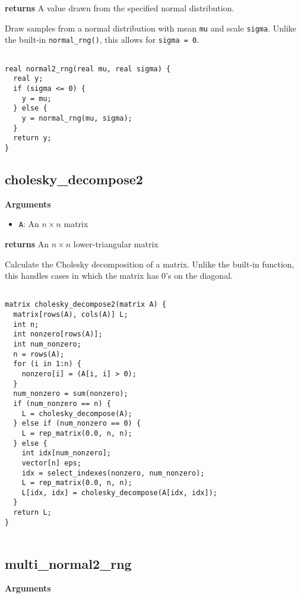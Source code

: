 \documentclass[]{book}
\providecommand{\tightlist}{%
  \setlength{\itemsep}{0pt}\setlength{\parskip}{0pt}}
\begin{document}
\textbf{returns} A value drawn from the specified normal distribution.

Draw samples from a normal distribution with mean \texttt{mu} and scale
\texttt{sigma}. Unlike the built-in \texttt{normal\_rng()}, this allows
for \texttt{sigma\ =\ 0}.

\begin{verbatim}

real normal2_rng(real mu, real sigma) {
  real y;
  if (sigma <= 0) {
    y = mu;
  } else {
    y = normal_rng(mu, sigma);
  }
  return y;
}

\end{verbatim}

\subsection{cholesky\_decompose2}\label{cholesky_decompose2}

\textbf{Arguments}

\begin{itemize}
\tightlist
\item
  \texttt{A}: An \(n \times n\) matrix
\end{itemize}

\textbf{returns} An \(n \times n\) lower-triangular matrix

Calculate the Cholesky decomposition of a matrix. Unlike the built-in
function, this handles cases in which the matrix has 0's on the
diagonal.

\begin{verbatim}

matrix cholesky_decompose2(matrix A) {
  matrix[rows(A), cols(A)] L;
  int n;
  int nonzero[rows(A)];
  int num_nonzero;
  n = rows(A);
  for (i in 1:n) {
    nonzero[i] = (A[i, i] > 0);
  }
  num_nonzero = sum(nonzero);
  if (num_nonzero == n) {
    L = cholesky_decompose(A);
  } else if (num_nonzero == 0) {
    L = rep_matrix(0.0, n, n);
  } else {
    int idx[num_nonzero];
    vector[n] eps;
    idx = select_indexes(nonzero, num_nonzero);
    L = rep_matrix(0.0, n, n);
    L[idx, idx] = cholesky_decompose(A[idx, idx]);
  }
  return L;
}


\end{verbatim}

\subsection{multi\_normal2\_rng}\label{multi_normal2_rng}

\textbf{Arguments}
\end{document}

